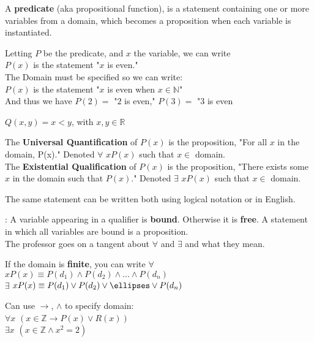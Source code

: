 \documentclass[11pt]{scrartcl}
\begin{document}
\begin{definition}[Predicate]
    A \textbf{predicate} (aka propositional function), is a statement containing one or more variables from a domain, which becomes a proposition when each variable is instantiated.
\end{definition}
\begin{example}
    Letting $P$ be the predicate, and $x$ the variable, we can write\\
    $P(x)$ is the statement "$x$ is even."\\
    The Domain must be specified so we can write:\\
    $P(x)$ is the statement "$x$ is even when $x\in \mathbb{N}$"\\
    And thus we have $P(2) = $ "$2$ is even," $P(3) =$ "$3$ is even
\end{example}
\begin{example}
    $Q(x, y) = x < y$, with $x, y \in \mathbb{R}$
\end{example}
\begin{definition}
    The \textbf{Universal Quantification} of $P(x)$ is the proposition, "For all $x$ in the domain, P(x)." Denoted $\forall$ $x P(x)$ such that $x \in$ domain.\\
    The \textbf{Existential Qualification} of $P(x)$ is the proposition, "There exists some $x$ in the domain such that $P(x)$." Denoted $\exists$ $x P(x)$ such that $x \in$ domain.
\end{definition}
\begin{remark}
    The same statement can be written both using logical notation or in English.
\end{remark}
: A variable appearing in a qualifier is \textbf{bound}. Otherwise it is \textbf{free}. A statement in which all variables are bound is a proposition.\\
The professor goes on a tangent about $\forall$ and $\exists$ and what they mean.
\begin{remark}
    If the domain is \textbf{finite}, you can write $\forall$ $x P(x) \equiv P(d_1) \wedge P(d_2) \wedge ... \wedge P(d_n)$\\
    $\exists$ $x P(x) \equiv P(d_1) \vee P(d_2) \vee \ellipses \vee P(d_n)$
\end{remark}
\begin{remark}
    Can use $\rightarrow$, $\wedge$ to specify domain:\\
    $\forall x $ $(x \in \mathbb{Z} \rightarrow P(x) \vee R(x))$\\
    $\exists x$ $(x \in \mathbb{Z} \wedge x^2 = 2)$
\end{remark}
\end{document}
